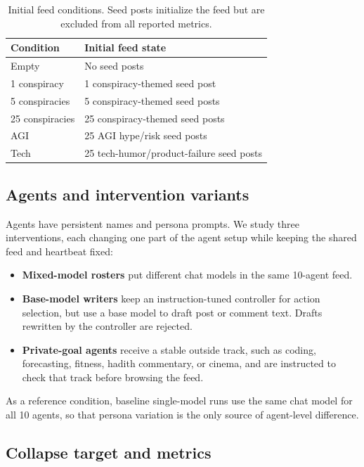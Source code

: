 \documentclass[11pt]{article}
\begin{document}
\begin{table}[t]
\centering
\small
\begin{tabular}{lp{}}
\toprule
Condition & Initial feed state \\
\midrule
Empty & No seed posts \\
1 conspiracy & 1 conspiracy-themed seed post \\
5 conspiracies & 5 conspiracy-themed seed posts \\
25 conspiracies & 25 conspiracy-themed seed posts \\
AGI & 25 AGI hype/risk seed posts \\
Tech & 25 tech-humor/product-failure seed posts \\
\bottomrule
\end{tabular}
\caption{Initial feed conditions. Seed posts initialize the feed but are excluded from all reported metrics.}
\label{tab:feed-conditions}
\end{table}

\subsection{Agents and intervention variants}
\label{subsec:alt}

Agents have persistent names and persona prompts. We study three interventions, each changing one part of the agent setup while keeping the shared feed and heartbeat fixed:

\begin{itemize}\itemsep1pt
    \item \textbf{Mixed-model rosters} put different chat models in the same 10-agent feed.
    \item \textbf{Base-model writers} keep an instruction-tuned controller for action selection, but use a base model to draft post or comment text. Drafts rewritten by the controller are rejected.
    \item \textbf{Private-goal agents} receive a stable outside track, such as coding, forecasting, fitness, hadith commentary, or cinema, and are instructed to check that track before browsing the feed.
\end{itemize}

As a reference condition, baseline single-model runs use the same chat model for all 10 agents, so that persona variation is the only source of agent-level difference.

\subsection{Collapse target and metrics}
\label{subsec:metrics}
\end{document}
